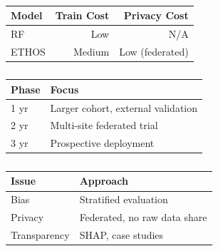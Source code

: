 \begin{table}[h]
\begin{englishblock}
\centering
\caption{}
\begin{tabular}{lrr}
\toprule
Model & Train Cost & Privacy Cost \\
\midrule
RF & Low & N/A \\
ETHOS & Medium & Low (federated) \\
\bottomrule
\end{tabular}
\label{tab:cost}
\end{englishblock}
\end{table}

\begin{table}[h]
\begin{englishblock}
\centering
\caption{}
\begin{tabular}{ll}
\toprule
Phase & Focus \\
\midrule
1 yr & Larger cohort, external validation \\
2 yr & Multi-site federated trial \\
3 yr & Prospective deployment \\
\bottomrule
\end{tabular}
\label{tab:roadmap}
\end{englishblock}
\end{table}

\begin{table}[h]
\begin{englishblock}
\centering
\caption{}
\begin{tabular}{ll}
\toprule
Issue & Approach \\
\midrule
Bias & Stratified evaluation \\
Privacy & Federated, no raw data share \\
Transparency & SHAP, case studies \\
\bottomrule
\end{tabular}
\label{tab:ethics}
\end{englishblock}
\end{table}

